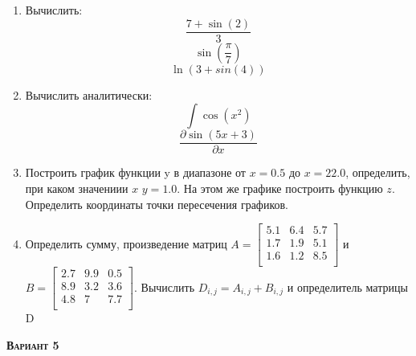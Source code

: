 \begin{enumerate}
\item Вычислить: 
\begin{equation*}\dfrac{7+\sin(2)}{3}              \end{equation*}
\begin{equation*}\sin \left( \dfrac{\pi}{7} \right)\end{equation*}
\begin{equation*}\ln(3+sin(4))                     \end{equation*}

\item Вычислить аналитически: 
 \begin{equation*} \int \cos(x^2)          \end{equation*}\begin{equation*} {\dfrac{\partial \sin(5 x +3)}{\partial x}} \end{equation*}
\item Построить график функции y в диапазоне от $x=0.5$ до $x=22.0$, определить, при каком значениии $x$ $y=1.0$. На этом же графике построить функцию $z $. Определить координаты точки пересечения графиков. \item Определить сумму, произведение матриц $A=\begin{bmatrix}
5.1 &6.4 &5.7 \\
1.7 &1.9 &5.1 \\
1.6 &1.2 &8.5 \\
\end{bmatrix}
$ и $B=\begin{bmatrix}
2.7 &9.9 &0.5 \\
8.9 &3.2 &3.6 \\
4.8 &7 &7.7 \\
\end{bmatrix}
$. Вычислить $D_{i,j}=A_{i,j} + B_{i,j}$ и определитель матрицы D
\end{enumerate}
\textsc{\textbf{Вариант 5}}


